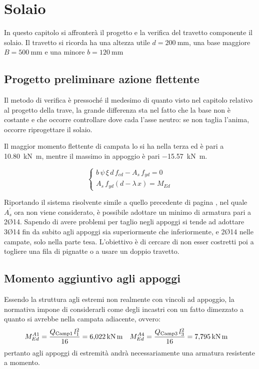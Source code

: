 \chapter{Solaio}
In questo capitolo si affronterà il progetto e la verifica del travetto componente il solaio.
Il travetto si ricorda ha una altezza utile $d=\SI{200}{\milli\metre}$, una base maggiore $B=\SI{500}{\milli\metre}$ e una minore $b=\SI{120}{\milli\metre}$

\section{Progetto preliminare azione flettente}
Il metodo di verifica è pressoché il medesimo di quanto visto nel capitolo relativo al progetto della trave, la grande differenza sta nel fatto che la base non è costante e che occorre controllare dove cada l'asse neutro: se non taglia l'anima, occorre riprogettare il solaio.

Il maggior momento flettente di campata lo si ha nella terza ed è pari a \SI{10.80}{\kilo\newton\metre}, mentre il massimo in appoggio è pari \SI{-15.57}{\kilo\newton\metre}.

\begin{equation}
    \begin{cases}
      b \, \psi \, \xi \, d \, f_{cd} - A_s \, f_{yd} = 0 \\
      A_s \, f_{yd} \left(d - \lambda\,x\right) = M_{Ed}
    \end{cases}
  \end{equation}

Riportando il sistema risolvente simile a quello precedente di pagina \pageref{eq:sistemaSLU}, nel quale $A_s^\prime$ ora non viene considerato, è possibile adottare un minimo di armatura pari a 2Ø14. 
Sapendo di avere problemi per taglio negli appoggi si tende ad adottare 3Ø14 fin da subito agli appoggi sia superiormente che inferiormente, e 2Ø14 nelle campate, solo nella parte tesa. 
L'obiettivo è di cercare di non esser costretti poi a togliere una fila di pignatte o a usare un doppio travetto.

\section{Momento aggiuntivo agli appoggi}
Essendo la struttura agli estremi non realmente con vincoli ad appoggio, la normativa impone di considerarli come degli incastri con un fatto dimezzato a quanto si avrebbe nella campata adiacente, ovvero:
\[
    M_{Ed}^{A1} = \frac{Q_\textup{Camp1} \, l_1^2 }{16} =  \SI{6.022}{\kilo\newton\metre} \quad M_{Ed}^{A4} = \frac{Q_\textup{Camp3} \, l_3^2 }{16} =  \SI{7.795}{\kilo\newton\metre} \quad
\]
pertanto agli appoggi di estremità andrà necessariamente una armatura resistente a momento.

